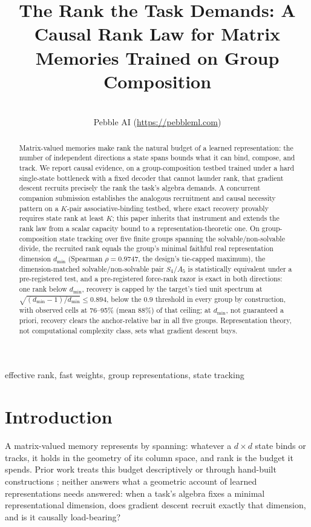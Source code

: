 \documentclass[mlabstract,onecolumn]{jmlr}
\title[A Causal Rank Law for Matrix Memories]{The Rank the Task Demands:
A Causal Rank Law for Matrix Memories Trained on Group Composition}
\author{\Name{Sam Larson} \Email{samlarson16@gmail.com}\\
\addr Pebble AI (\url{https://pebbleml.com})}
\newcommand{\dmin}{d_{\min}}
\begin{document}
\maketitle

\begin{abstract}
Matrix-valued memories make rank the natural budget of a learned
representation: the number of independent directions a state spans bounds
what it can bind, compose, and track. We report causal evidence, on a
group-composition testbed trained under a hard single-state bottleneck
with a fixed decoder that cannot launder rank, that gradient descent
recruits precisely the rank the task's algebra demands. A concurrent
companion submission establishes the analogous recruitment and causal
necessity pattern on a $K$-pair associative-binding testbed, where exact
recovery provably requires state rank at least $K$; this paper inherits
that instrument and extends the rank law from a scalar capacity bound to
a representation-theoretic one.
On
group-composition state tracking over five finite groups spanning the
solvable/non-solvable divide, the recruited rank equals the group's minimal
faithful real representation dimension $\dmin$ (Spearman $\rho = 0.9747$,
the design's tie-capped maximum),
the dimension-matched solvable/non-solvable
pair $S_4$/$A_5$ is statistically equivalent under a pre-registered
test,
and a pre-registered force-rank razor is exact in both
directions: one rank below $\dmin$, recovery is capped by the target's
tied unit spectrum at $\sqrt{(\dmin{-}1)/\dmin} \le 0.894$, below the
$0.9$ threshold in every group by construction, with observed cells
at 76--95\% (mean 88\%) of that ceiling;
at $\dmin$, not
guaranteed a priori, recovery clears the
anchor-relative bar in all five groups.
Representation theory, not
computational complexity class, sets what gradient descent buys.
\end{abstract}

\begin{keywords}
effective rank, fast weights, group representations, state tracking
\end{keywords}

\section{Introduction}
\label{sec:intro}

A matrix-valued memory represents by spanning: whatever a $d \times d$
state binds or tracks, it holds in the geometry of its column space, and
rank is the budget it spends. Prior work treats this budget
descriptively \citep{nazari2026rank, sun2026staterank} or through
hand-built constructions \citep{nichani2025factual}; neither answers
what a geometric account of learned representations needs answered:
when a task's algebra fixes a minimal representational dimension, does
gradient descent recruit exactly that dimension, and is it causally
load-bearing?
\end{document}
